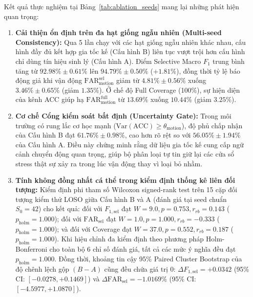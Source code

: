\documentclass[conference]{IEEEtran}
\begin{document}
Kết quả thực nghiệm tại Bảng~\ref{tab:ablation_seeds} mang lại những phát hiện quan trọng:
\begin{enumerate}
    \item \textbf{Cải thiện ổn định trên đa hạt giống ngẫu nhiên (Multi-seed Consistency):} Qua 5 lần chạy với các hạt giống ngẫu nhiên khác nhau, cấu hình đầy đủ kết hợp gia tốc kế (Cấu hình B) liên tục vượt trội hơn cấu hình chỉ dùng tín hiệu sinh lý (Cấu hình A). Điểm Selective Macro $F_1$ trung bình tăng từ $92.98\% \pm 0.61\%$ lên $94.79\% \pm 0.50\%$ ($+1.81\%$), đồng thời tỷ lệ báo động giả khi vận động $\text{FAR}_{\text{motion}}^{\text{sel}}$ giảm từ $4.81\% \pm 0.56\%$ xuống $3.46\% \pm 0.65\%$ (giảm $1.35\%$). Ở chế độ Full Coverage (100\%), sự hiện diện của kênh ACC giúp hạ $\text{FAR}_{\text{motion}}^{\text{full}}$ từ $13.69\%$ xuống $10.44\%$ (giảm $3.25\%$).
    \item \textbf{Cơ chế Cổng kiểm soát bất định (Uncertainty Gate):} Trong môi trường có rung lắc cơ học mạnh ($\text{Var}(\text{ACC}) \ge \theta_{\text{motion}}$), độ phủ chấp nhận của Cấu hình B đạt $61.76\% \pm 0.98\%$, cao hơn rõ rệt so với $56.05\% \pm 1.94\%$ của Cấu hình A. Điều này chứng minh rằng dữ liệu gia tốc kế cung cấp ngữ cảnh chuyển động quan trọng, giúp bộ phân loại tự tin giữ lại các cửa sổ stress thật sự xảy ra trong lúc vận động thay vì loại bỏ nhầm.
    \item \textbf{Tính không đồng nhất cá thể trong kiểm định thống kê liên đối tượng:} Kiểm định phi tham số Wilcoxon signed-rank test trên 15 cặp đối tượng kiểm thử LOSO giữa Cấu hình B và A (đánh giá tại seed chuẩn $S_0=42$) cho kết quả: đối với $F_{1,\text{sel}}$ đạt $W = 9.0, p = 0.753, r_{rb} = 0.143$ ($p_{\text{holm}} = 1.000$); đối với $\text{FAR}_{\text{sel}}$ đạt $W = 1.0, p = 1.000, r_{rb} = -0.333$ ($p_{\text{holm}} = 1.000$); và đối với Coverage đạt $W = 37.0, p = 0.552, r_{rb} = 0.187$ ($p_{\text{holm}} = 1.000$). Khi hiệu chỉnh đa kiểm định theo phương pháp Holm-Bonferroni cho toàn bộ 6 chỉ số đánh giá, tất cả các mức ý nghĩa đều đạt $p_{\text{holm}} = 1.000$. Đồng thời, khoảng tin cậy 95\% Paired Cluster Bootstrap của độ chênh lệch gộp $(B - A)$ cũng đều chứa giá trị 0: $\Delta F_{1,\text{sel}} = +0.0342$ (95\% CI: $[-0.0278, +0.1469]$) và $\Delta \text{FAR}_{\text{sel}} = -1.0169\%$ (95\% CI: $[-4.5977, +1.0870]$). 


\end{enumerate}
\end{document}
